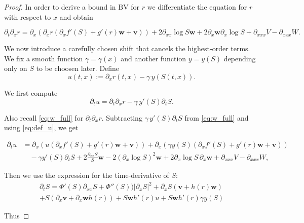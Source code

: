 \documentclass[a4paper,twosided, 11pt]{article}
\newcommand*{\vv}{\mathbf{v}}
\newcommand*{\ww}{\mathbf{w}}
\theoremstyle{plain}
\theoremstyle{remark}
\numberwithin{equation}{section}
\begin{document}
\begin{proof}
In order to derive a bound in $\mathrm{BV}$ for $r$ we differentiate the equation for $r$ with respect to $x$ and obtain

\begin{equation}\label{eq:w_full}
\partial_{t}\partial_{x}r = \partial_{x}\left(\partial_x r \left(\partial_x f'(S)+g'(r)\ww + \vv\right)\right)    + 2\partial_{xx}\log S \ww + 2\partial_x\ww\partial_{x}\log S + \partial_{xxx}V-\partial_{xxx}W.
\end{equation}

We now introduce a carefully chosen shift that cancels the highest‐order terms.  We fix a smooth function $\gamma=\gamma(x) $ and another function $y=y(S)$ depending only on $S$ to be choosen later.  Define
\begin{equation}\label{eq:def_u}
u(t,x) := \partial_{x}r(t,x)  - \gamma \,y \left(S(t,x) \right).
\end{equation}

We first compute 
$$
\partial_t u 
= \partial_t \partial_x r 
 - \gamma\,y' \left(S \right)\partial_t S.
$$


Also recall \eqref{eq:w_full} for $\partial_t \partial_x r$.  Subtracting $\gamma\,y'(S)\partial_t S$ from \eqref{eq:w_full} and using \eqref{eq:def_u}, we get

\begin{align*}
\partial_{t}u 
&= \partial_{x}\left(u\left(\partial_{x}f'(S)  +  g'(r)\ww  +  \vv\right)\right) 
   + \partial_{x}\left(\gamma y(S)\left(\partial_{x}f'(S)  +  g'(r)\ww  +  \vv\right)\right) \\
&\quad - \gamma y'(S)\partial_{t}S 
   +  2\frac{\partial_{xx}S}{S}\ww
   -  2\left(\partial_x \log S\right)^2\ww
   +  2\partial_{x}\log S\,\partial_x\ww
   +  \partial_{xxx}V  - \partial_{xxx}W,
\end{align*}



Then we use the expression for the time-derivative of $S$:
\begin{multline*}
\partial_t S = \Phi'(S)\partial_{xx}S +\Phi''(S))|\partial_x S|^2 + \partial_x S(\vv + h(r)\ww) \\+ S(\partial_x\vv + \partial_x\ww h(r)) + S\ww h'(r)u + S\ww h'(r)\gamma  y(S)
\end{multline*}



Thus 



\end{proof}
\end{document}
